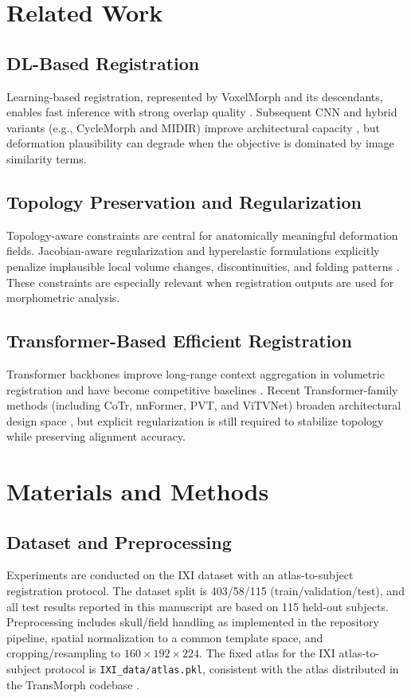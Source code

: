 \documentclass[jimaging,article,submit,pdftex,moreauthors]{Definitions/mdpi}
\begin{document}
\section{Related Work}

\subsection{DL-Based Registration}
Learning-based registration, represented by VoxelMorph and its descendants, enables fast inference with strong overlap quality \citep{balakrishnan2019voxelmorph}. Subsequent CNN and hybrid variants (e.g., CycleMorph and MIDIR) improve architectural capacity \citep{kim2021cyclemorph,qiu2021midir}, but deformation plausibility can degrade when the objective is dominated by image similarity terms.

\subsection{Topology Preservation and Regularization}
Topology-aware constraints are central for anatomically meaningful deformation fields. Jacobian-aware regularization and hyperelastic formulations explicitly penalize implausible local volume changes, discontinuities, and folding patterns \citep{burger2013hyperelastic,ashburner1999morphometry,rueckert1999nonrigid}. These constraints are especially relevant when registration outputs are used for morphometric analysis.

\subsection{Transformer-Based Efficient Registration}
Transformer backbones improve long-range context aggregation in volumetric registration and have become competitive baselines \citep{chen2022transmorph,liu2021swin}. Recent Transformer-family methods (including CoTr, nnFormer, PVT, and ViTVNet) broaden architectural design space \citep{xie2021cotr,zhou2021nnformer,wang2021pvt,vitvnet2021}, but explicit regularization is still required to stabilize topology while preserving alignment accuracy.

\section{Materials and Methods}

\subsection{Dataset and Preprocessing}
Experiments are conducted on the IXI dataset \citep{ixidataset} with an atlas-to-subject registration protocol. The dataset split is 403/58/115 (train/validation/test), and all test results reported in this manuscript are based on 115 held-out subjects. Preprocessing includes skull/field handling as implemented in the repository pipeline, spatial normalization to a common template space, and cropping/resampling to \(160 \times 192 \times 224\). The fixed atlas for the IXI atlas-to-subject protocol is \texttt{IXI\_data/atlas.pkl}, consistent with the atlas distributed in the TransMorph codebase \citep{chen2022transmorph,kim2021cyclemorph}.
\end{document}

